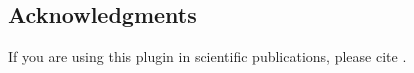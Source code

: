 \subsection{Acknowledgments}

If you are using this plugin in scientific publications, please cite \citet{Zotti-etal:JSA2020.6.2}.



